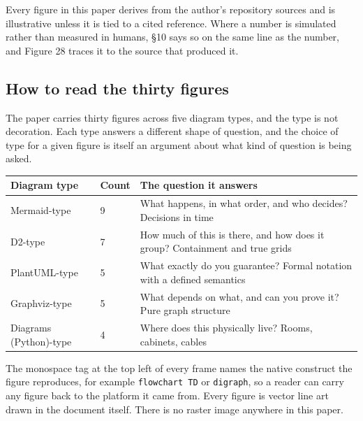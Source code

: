 Every figure in this paper derives from the author's repository sources and is
illustrative unless it is tied to a cited reference. Where a number is
simulated rather than measured in humans, \S 10 says so on the same line as the
number, and Figure 28 traces it to the source that produced it.

\subsection{How to read the thirty figures}

The paper carries thirty figures across five diagram types, and the type is not
decoration. Each type answers a different shape of question, and the choice of
type for a given figure is itself an argument about what kind of question is
being asked.

\vspace{0.30em}

\noindent\begin{tabularx}{\textwidth}{L{3.7cm} C{1.3cm} Y}
\toprule
\textbf{Diagram type} & \textbf{Count} & \textbf{The question it answers} \\
\midrule
Mermaid-type & 9 & What happens, in what order, and who decides? Decisions in time \\
D2-type & 7 & How much of this is there, and how does it group? Containment and true grids \\
PlantUML-type & 5 & What exactly do you guarantee? Formal notation with a defined semantics \\
Graphviz-type & 5 & What depends on what, and can you prove it? Pure graph structure \\
Diagrams (Python)-type & 4 & Where does this physically live? Rooms, cabinets, cables \\
\bottomrule
\end{tabularx}

\vspace{0.30em}

\noindent The monospace tag at the top left of every frame names the native
construct the figure reproduces, for example \texttt{flowchart TD} or
\texttt{digraph}, so a reader can carry any figure back to the platform it came
from. Every figure is vector line art drawn in the document itself. There is no
raster image anywhere in this paper.

